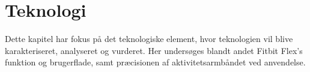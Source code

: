 \chapter{Teknologi}
Dette kapitel har fokus på det teknologiske element, hvor teknologien vil blive karakteriseret, analyseret og vurderet. Her undersøges blandt andet Fitbit Flex's funktion og brugerflade, samt præcisionen af aktivitetsarmbåndet ved anvendelse.









